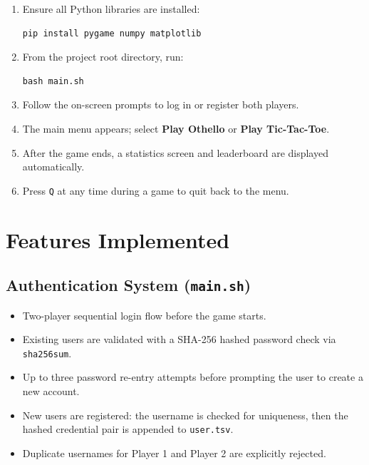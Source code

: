 \documentclass[12pt]{article}
\begin{document}
\begin{enumerate}
    \item Ensure all Python libraries are installed:
\begin{lstlisting}[style=bashstyle]
pip install pygame numpy matplotlib
\end{lstlisting}
    \item From the project root directory, run:
\begin{lstlisting}[style=bashstyle]
bash main.sh
\end{lstlisting}
    \item Follow the on-screen prompts to log in or register both players.
    \item The main menu appears; select \textbf{Play Othello} or \textbf{Play Tic-Tac-Toe}.
    \item After the game ends, a statistics screen and leaderboard are displayed automatically.
    \item Press \texttt{Q} at any time during a game to quit back to the menu.
\end{enumerate}

\section{Features Implemented}

\subsection{Authentication System (\texttt{main.sh})}
\begin{itemize}
    \item Two-player sequential login flow before the game starts.
    \item Existing users are validated with a SHA-256 hashed password check via \texttt{sha256sum}.
    \item Up to three password re-entry attempts before prompting the user to create a new account.
    \item New users are registered: the username is checked for uniqueness, then the hashed credential pair is appended to \texttt{user.tsv}.
    \item Duplicate usernames for Player 1 and Player 2 are explicitly rejected.
\end{itemize}
\end{document}
